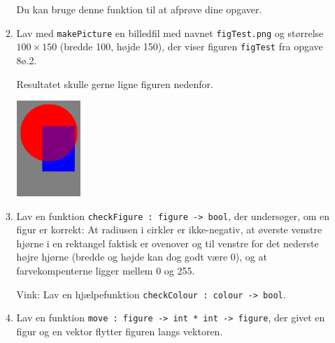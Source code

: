 \documentclass[a4paper,12pt]{article}
\begin{document}
\begin{enumerate}[label=8ø.\arabic*,start=0]
\begin{enumerate}[label=7ø.\arabic*,start=7]
  Du kan bruge denne funktion til at afprøve dine opgaver.

\item Lav med \texttt{makePicture} en billedfil med navnet
  \texttt{figTest.png} og størrelse $100\times150$ (bredde 100, højde 150),
  der viser figuren \texttt{figTest} fra opgave 8ø.2.

  Resultatet skulle gerne ligne figuren nedenfor.
  \begin{center}
    \includegraphics[width=0.2\textwidth]{figTest.png}
  \end{center}
\item Lav en funktion \texttt{checkFigure : figure -> bool},
  der undersøger, om en figur er korrekt: At radiusen i cirkler
  er ikke-negativ, at øverste venstre hjørne i en rektangel faktisk
  er ovenover og til venstre for det nederste højre hjørne (bredde og
  højde kan dog godt være 0), og at farvekompenterne ligger mellem 0
  og 255.

  Vink: Lav en hjælpefunktion \texttt{checkColour : colour -> bool}.

\item Lav en funktion \texttt{move : figure -> int * int ->
    figure}, der givet en figur og en vektor flytter figuren langs
  vektoren.
  

\end{enumerate}
\end{enumerate}
\end{document}
